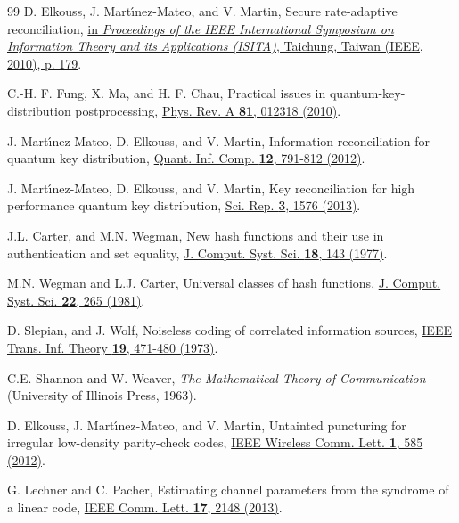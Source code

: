 \documentclass[aps,pra,twocolumn,amsmath,amssymb,nofootinbib,showpacs,superscriptaddress]{revtex4-1}
\begin{document}
\begin{thebibliography}{99}
D. Elkouss, J. Mart{\'{\i}}nez{-}Mateo, and V. Martin,
Secure rate-adaptive reconciliation,
{\href{https://dx.doi.org/10.1109/ISITA.2010.5650099}
{in {\it Proceedings of the IEEE International Symposium on Information Theory and its Applications (ISITA)}, Taichung, Taiwan (IEEE, 2010), p. 179}}.

C.-H. F. Fung, X. Ma, and H. F. Chau,
Practical issues in quantum-key-distribution postprocessing,
{\href{https://doi.org/10.1103/PhysRevA.81.012318}{Phys. Rev. A {\bf81}, 012318 (2010)}}.

J. Mart{\'{\i}}nez{-}Mateo, D. Elkouss, and V. Martin,
Information reconciliation for quantum key distribution,
{\href{https://dblp2.uni-trier.de/db/journals/qic/qic12.html}{Quant. Inf. Comp. {\bf 12}, 791-812 (2012)}}.

J. Mart{\'{\i}}nez{-}Mateo, D. Elkouss, and V. Martin,
Key reconciliation for high performance quantum key distribution,
{\href{https://dx.doi.org/doi:10.1038/srep01576}{Sci. Rep. {\bf 3}, 1576 (2013)}}.

J.L. Carter, and M.N. Wegman,
New hash functions and their use in authentication and set equality,
{\href{https://dx.doi.org/10.1016/0022-0000(79)90044-8}{J. Comput. Syst. Sci. {\bf 18}, 143 (1977)}}.

M.N. Wegman and L.J. Carter,
Universal classes of hash functions,
{\href{https://dx.doi.org/10.1016/0022-0000(81)90033-7}{J. Comput. Syst. Sci. {\bf 22}, 265 (1981)}}.

D. Slepian, and J. Wolf,
Noiseless coding of correlated information sources,
{\href{https://dx.doi.org/10.1109/TIT.1973.1055037}{IEEE Trans. Inf. Theory {\bf 19}, 471-480 (1973)}}.

C.E. Shannon and W. Weaver,
{\it The Mathematical Theory of Communication} 
(University of Illinois Press, 1963).

D. Elkouss, J. Mart{\'{\i}}nez{-}Mateo, and V. Martin,
Untainted puncturing for irregular low-density parity-check codes,
{\href{https://dx.doi.org/10.1109/WCL.2012.082712.120531}{IEEE Wireless Comm. Lett. {\bf 1}, 585 (2012)}}.

G. Lechner and C. Pacher,
Estimating channel parameters from the syndrome of a linear code,
{\href{https://dx.doi.org/10.1109/LCOMM.2013.091113.131646}{IEEE Comm. Lett. {\bf 17}, 2148 (2013)}}.


\end{thebibliography}
\end{document}
